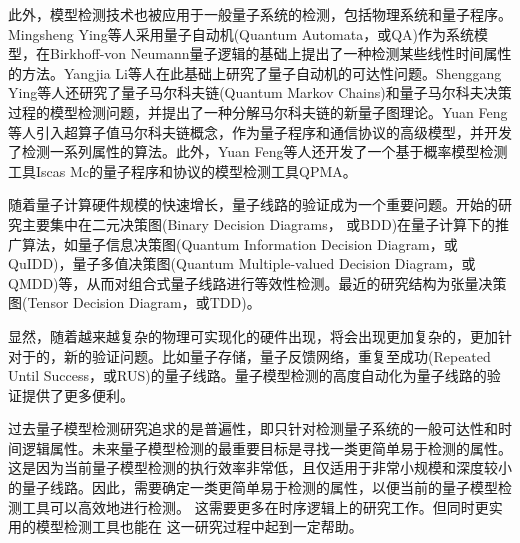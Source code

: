 此外，模型检测技术也被应用于一般量子系统的检测，包括物理系统和量子程序。Mingsheng Ying等人采用量子自动机(Quantum Automata，或QA)作为系统模型\citep{kondacs1997power}，在Birkhoff-von Neumann量子逻辑\citep{birkhoff1987logic}的基础上提出了一种检测某些线性时间属性的方法\citep{ying2014model}。Yangjia Li等人在此基础上研究了量子自动机的可达性问题\citep{li2014decidable}。Shenggang Ying等人还研究了量子马尔科夫链(Quantum Markov Chains)\citep{ying2013verification}和量子马尔科夫决策过程的模型检测问题，并提出了一种分解马尔科夫链的新量子图理论\citep{ying2013reachability,ying2018reachability}。Yuan Feng等人引入超算子值马尔科夫链概念，作为量子程序和通信协议的高级模型，并开发了检测一系列属性的算法\citep{feng2013model,feng2013reachability,feng2017model}。此外，Yuan Feng等人还开发了一个基于概率模型检测工具Iscas Mc\citep{hahn2014iscas}的量子程序和协议的模型检测工具QPMA\citep{feng2015qpmc}。

随着量子计算硬件规模的快速增长，量子线路的验证成为一个重要问题。开始的研究主要集中在二元决策图(Binary Decision Diagrams， 或BDD)在量子计算下的推广算法，如量子信息决策图(Quantum Information Decision Diagram，或QuIDD)\citep{Viamontes_2003}，量子多值决策图(Quantum Multiple-valued Decision Diagram，或QMDD)\citep{Seiter_2013}等，从而对组合式量子线路进行等效性检测。最近的研究结构为张量决策图(Tensor Decision Diagram，或TDD)\citep{Hong_2022}。

显然，随着越来越复杂的物理可实现化的硬件出现，将会出现更加复杂的，更加针对于的，新的验证问题。比如量子存储\citep{Kerckhoff_2010}，量子反馈网络\citep{Gough_2008}，重复至成功(Repeated Until Success，或RUS)的量子线路\citep{Bocharov_2015}。量子模型检测的高度自动化为量子线路的验证提供了更多便利。

过去量子模型检测研究追求的是普遍性，即只针对检测量子系统的一般可达性和时间逻辑属性。未来量子模型检测的最重要目标是寻找一类更简单易于检测的属性。这是因为当前量子模型检测的执行效率非常低，且仅适用于非常小规模和深度较小的量子线路。因此，需要确定一类更简单易于检测的属性，以便当前的量子模型检测工具可以高效地进行检测\citep{ying2021model}。
这需要更多在时序逻辑上的研究工作。但同时更实用的模型检测工具也能在
这一研究过程中起到一定帮助。


